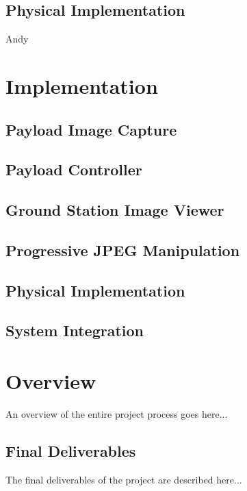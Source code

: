 \documentclass[oneside]{ecsgdp}         %
\begin{document}
\section{Physical Implementation}
Andy

\chapter{Implementation}


\section{Payload Image Capture}

\section{Payload Controller}

\section{Ground Station Image Viewer}

\section{Progressive JPEG Manipulation}

\section{Physical Implementation}

\section{System Integration}


\chapter{Overview}
An overview of the entire project process goes here...

\section{Final Deliverables}
The final deliverables of the project are described here...
\end{document}
